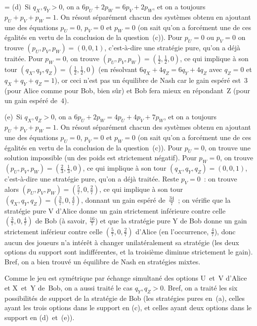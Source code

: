 \documentclass[12pt,a4paper]{article}
\theoremstyle{definition}
\newif\ifcorrige
\newenvironment{corrige}%
{\ifcorrige\relax\else\setbox0=\vbox\bgroup\fi%
\smallbreak\noindent{\underbar{\textit{Corrigé.}}\quad}}
{{\hbox{}\nobreak\hfill\checkmark}%
\ifcorrige\relax\else\egroup\fi\par}
\begin{document}
\begin{corrige}
(d) Si $q_X,q_Y > 0$, on a $6 p_U + 2 p_W = 6 p_V + 2 p_W$, et on a
toujours $p_U + p_V + p_W = 1$.  On résout séparément chacun des
systèmes obtenu en ajoutant une des équations $p_U = 0$, $p_V = 0$ et
$p_W = 0$ (on sait qu'on a forcément une de ces égalités en vertu de
la conclusion de la question (c)).  Pour $p_U = 0$ ou $p_V = 0$ on
trouve $(p_U, p_V, p_W) = (0,0,1)$, c'est-à-dire une stratégie pure,
qu'on a déjà traitée.  Pour $p_W = 0$, on trouve $(p_U, p_V, p_W) =
(\frac{1}{2},\frac{1}{2},0)$, ce qui implique à son tour $(q_X, q_Y,
q_Z) = (\frac{1}{2},\frac{1}{2},0)$ (en résolvant $6 q_X + 4 q_Z = 6
q_Y + 4 q_Z$ avec $q_Z = 0$ et $q_X + q_Y + q_Z = 1$), or ceci n'est
pas un équilibre de Nash car le gain espéré est $3$ (pour Alice comme
pour Bob, bien sûr) et Bob fera mieux en répondant Z (pour un gain
espéré de $4$).

(e) Si $q_X,q_Z > 0$, on a $6 p_U + 2 p_W = 4 p_U + 4 p_V + 7 p_W$, et
on a toujours $p_U + p_V + p_W = 1$.  On résout séparément chacun des
systèmes obtenu en ajoutant une des équations $p_U = 0$, $p_V = 0$ et
$p_W = 0$ (on sait qu'on a forcément une de ces égalités en vertu de
la conclusion de la question (c)).  Pour $p_U = 0$, on trouve une
solution impossible (un des poids est strictement négatif).  Pour $p_W
= 0$, on trouve $(p_U, p_V, p_W) = (\frac{2}{3},\frac{1}{3},0)$, ce
qui implique à son tour $(q_X, q_Y, q_Z) = (0,0,1)$, c'est-à-dire une
stratégie pure, qu'on a déjà traitée.  Reste $p_V = 0$ : on trouve
alors $(p_U, p_V, p_W) = (\frac{5}{7},0,\frac{2}{7})$, ce qui implique
à son tour $(q_X, q_Y, q_Z) = (\frac{3}{7},0,\frac{4}{7})$, donnant un
gain espéré de $\frac{34}{7}$ ; on vérifie que la stratégie pure V
d'Alice donne un gain strictement inférieure contre celle
$(\frac{3}{7},0,\frac{4}{7})$ de Bob (à savoir, $\frac{16}{7}$) et que
la stratégie pure Y de Bob donne un gain strictement inférieur contre
celle $(\frac{5}{7},0,\frac{2}{7})$ d'Alice (en l'occurrence,
$\frac{4}{7}$), donc aucun des joueurs n'a intérêt à changer
unilatéralement sa stratégie (les deux options du support sont
indifférentes, et la troisième diminue strictement le gain).  Bref, on
a bien trouvé un équilibre de Nash en stratégies mixtes.

Comme le jeu est symétrique par échange simultané des options U et V
d'Alice et X et Y de Bob, on a aussi traité le cas $q_Y,q_Z > 0$.
Bref, on a traité les six possibilités de support de la stratégie de
Bob (les stratégies pures en (a), celles ayant les trois options dans
le support en (c), et celles ayant deux options dans le support en
(d) et (e)).


\end{corrige}
\end{document}
